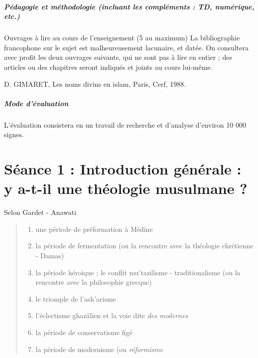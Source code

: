 \paragraph{Pédagogie et méthodologie (incluant les compléments : TD, numérique, etc.)}




Ouvrages à lire au cours de l’enseignement (5 au maximum)
La bibliographie francophone sur le sujet est malheureusement lacunaire, et datée. On consultera avec profit les deux ouvrages suivants, qui ne sont pas à lire en entier ; des articles ou des chapitres seront indiqués et joints au cours lui-même.
\cite{Gardet:IntroductionTheoMusulmane}


D. GIMARET, Les noms divins en islam, Paris, Cerf, 1988.

\paragraph{Mode d’évaluation}
L’évaluation consistera en un travail de recherche et d’analyse d’environ 10 000 signes.


\chapter{Séance 1 : Introduction générale : y a-t-il une théologie musulmane ? }
Selon Gardet - Anawati
\begin{quote}
    \begin{enumerate}
        \item une période de préformation à Médine
        \item la période de fermentation (ou la rencontre avec la théologie chrétienne - Damas)
        \item la période héroique ; le conflit mu'tazilisme - traditionalisme (ou la rencontre avec la philosophie grecque)
        \item le triomple de l'ash'arisme
        \item l'éclectisme ghazâlien et la voie dite \textit{des modernes}
        \item la période de conservatisme figé
        \item la période de modernisme (ou \textit{réformisme}
    \end{enumerate}
\end{quote}




